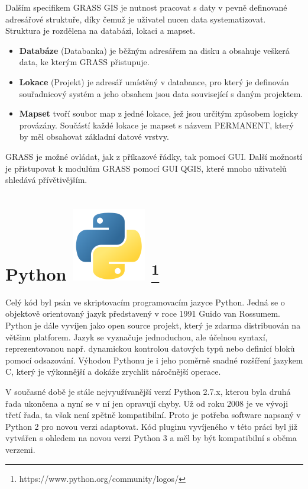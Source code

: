 Dalším specifikem GRASS GIS je nutnost pracovat s daty v pevně
definované adresářové struktuře, díky čemuž je uživatel nucen data
systematizovat. Struktura je rozdělena na databázi, lokaci a mapset.
\begin{itemize}
	\item \textbf{Databáze} (Databanka) je běžným adresářem na disku a 
	obsahuje veškerá data, ke kterým GRASS přistupuje.
	\item \textbf{Lokace} (Projekt) je adresář umístěný v databance, 
	pro který je definován souřadnicový systém a jeho obsahem jsou data 
	související s daným projektem.
	\item \textbf{Mapset} tvoří soubor map z jedné lokace, jež jsou 
	určitým způsobem logicky provázány. Součástí každé lokace je mapset 
	s názvem PERMANENT, který by měl obsahovat základní datové vrstvy.
\end{itemize}
GRASS je možné ovládat, jak z příkazové řádky, tak pomocí GUI. Další
možností je přistupovat k modulům GRASS pomocí GUI QGIS, které mnoho
uživatelů shledává přívětivějším.
\newpage
\section[Python]{Python \includegraphics[scale=0.2]{./pictures/python.png}
\footnote{https://www.python.org/community/logos/}}
\label{python}
Celý kód byl psán ve skriptovacím programovacím jazyce Python. Jedná
se o objektově orientovaný jazyk představený v roce 1991 Guido van
Rossumem. Python je dále vyvíjen jako open source projekt, který je
zdarma distribuován na většinu platforem. Jazyk se vyznačuje
jednoduchou, ale účelnou syntaxí, reprezentovanou např. dynamickou
kontrolou datových typů nebo definicí bloků pomocí odsazování. Výhodou
Pythonu je i jeho poměrně snadné rozšíření jazykem C, který je
výkonnější a dokáže zrychlit náročnější operace.

V současné době je stále nejvyužívanější verzí Python 2.7.x, kterou
byla druhá řada ukončena a nyní se v ní jen opravují chyby. Už od roku
2008 je ve vývoji třetí řada, ta však není zpětně kompatibilní. Proto
je potřeba software napsaný v Python 2 pro novou verzi adaptovat. Kód 
pluginu vyvíjeného v této práci byl již vytvářen s ohledem na novou 
verzi Python 3 a měl by být kompatibilní s oběma verzemi.
\cite{diveIntoPython}\cite{learningPython}


